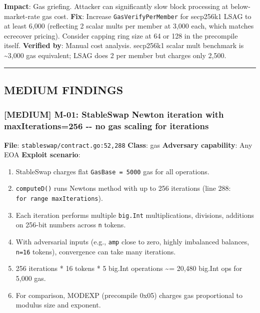 \documentclass[
]{article}
\providecommand{\tightlist}{%
  \setlength{\itemsep}{0pt}\setlength{\parskip}{0pt}}
\begin{document}
\textbf{Impact}: Gas griefing. Attacker can significantly slow block
processing at below-market-rate gas cost. \textbf{Fix}: Increase
\texttt{GasVerifyPerMember} for secp256k1 LSAG to at least 6,000
(reflecting 2 scalar mults per member at 3,000 each, which matches
ecrecover pricing). Consider capping ring size at 64 or 128 in the
precompile itself. \textbf{Verified by}: Manual cost analysis. secp256k1
scalar mult benchmark is \textasciitilde3,000 gas equivalent; LSAG does
2 per member but charges only 2,500.

\begin{center}\rule{0.5\linewidth}{0.5pt}\end{center}

\subsection{MEDIUM FINDINGS}\label{medium-findings}

\subsubsection{{[}MEDIUM{]} M-01: StableSwap Newton iteration with
maxIterations=256 -\/- no gas scaling for
iterations}\label{medium-m-01-stableswap-newton-iteration-with-maxiterations256----no-gas-scaling-for-iterations}

\textbf{File}: \texttt{stableswap/contract.go:52,288} \textbf{Class}:
gas \textbf{Adversary capability}: Any EOA \textbf{Exploit scenario}:

\begin{enumerate}
\def\labelenumi{\arabic{enumi}.}
\tightlist
\item
  StableSwap charges flat \texttt{GasBase\ =\ 5000} gas for all
  operations.
\item
  \texttt{computeD()} runs Newton\textquotesingle s method with up to
  256 iterations (line 288: \texttt{for\ range\ maxIterations}).
\item
  Each iteration performs multiple \texttt{big.Int} multiplications,
  divisions, additions on 256-bit numbers across \texttt{n} tokens.
\item
  With adversarial inputs (e.g., \texttt{amp} close to zero, highly
  imbalanced balances, \texttt{n=16} tokens), convergence can take many
  iterations.
\item
  256 iterations * 16 tokens * 5 big.Int operations \textasciitilde=
  20,480 big.Int ops for 5,000 gas.
\item
  For comparison, MODEXP (precompile 0x05) charges gas proportional to
  modulus size and exponent.
\end{enumerate}
\end{document}
